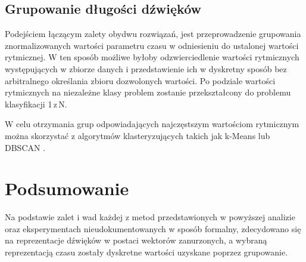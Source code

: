 {{        \subsection{Grupowanie długości dźwięków}\label{sec:group_rythm}
        {
            Podejściem łączącym zalety obydwu rozwiązań, jest przeprowadzenie grupowania znormalizowanych wartości parametru czasu w
            odniesieniu do ustalonej wartości rytmicznej. W ten sposób możliwe byłoby odzwierciedlenie wartości rytmicznych
            występujących w zbiorze danych i przedstawienie ich w dyskretny sposób bez arbitralnego określania zbioru dozwolonych
            wartości. 
            Po podziale wartości rytmicznych na niezależne klasy problem zostanie przekształcony do problemu klasyfikacji 1\,z\,N. 

            W celu otrzymania grup odpowiadających najczęstszym wartościom rytmicznym można skorzystać 
            z algorytmów klasteryzujących takich jak k-Means \cite{MacQueen1967SomeMF} lub DBSCAN \cite{Ester1996ADA}.
        }
    }

    \section{Podsumowanie}
    {
        Na podstawie zalet i wad każdej z metod przedstawionych w powyższej analizie oraz eksperymentach nieudokumentowanych w sposób formalny, zdecydowano się na reprezentacje dźwięków w postaci
        wektorów zanurzonych, a wybraną reprezentacją czasu zostały dyskretne wartości uzyskane poprzez grupowanie.
    }
}